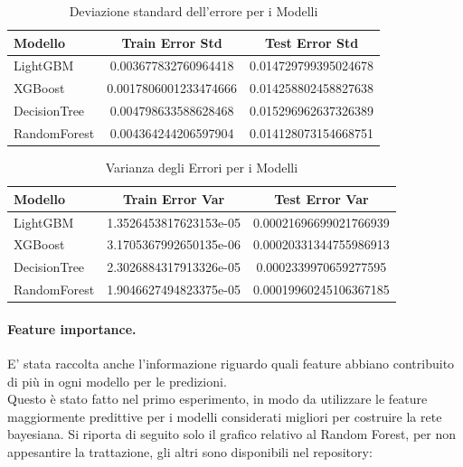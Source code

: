 \begin{table}[H]
    \centering
    \begin{tabular}{lcc}
    \toprule
    \textbf{Modello} & \textbf{Train Error Std} & \textbf{Test Error Std} \\
    \midrule
    LightGBM & 0.003677832760964418 & 0.014729799395024678 \\
    XGBoost & 0.0017806001233474666 & 0.014258802458827638 \\
    DecisionTree & 0.004798633588628468 & 0.015296962637326389 \\
    RandomForest & 0.004364244206597904 & 0.014128073154668751 \\
    \bottomrule
    \end{tabular}
    \caption{Deviazione standard dell'errore per i Modelli}
    
\end{table}

\begin{table}[H]
    \centering
    \begin{tabular}{lcc}
    \toprule
    \textbf{Modello} & \textbf{Train Error Var} & \textbf{Test Error Var} \\
    \midrule
    LightGBM & 1.3526453817623153e-05 & 0.00021696699021766939 \\
    XGBoost & 3.1705367992650135e-06 & 0.00020331344755986913 \\
    DecisionTree & 2.3026884317913326e-05 & 0.0002339970659277595 \\
    RandomForest & 1.9046627494823375e-05 & 0.00019960245106367185 \\
    \bottomrule
    \end{tabular}
    \caption{Varianza degli Errori per i Modelli}
    
\end{table}

\paragraph{Feature importance.} E' stata raccolta anche l'informazione riguardo quali feature abbiano contribuito di più in ogni modello per le predizioni.
\\Questo è stato fatto nel primo esperimento, in modo da utilizzare le feature maggiormente predittive per i modelli considerati migliori per costruire la rete bayesiana. Si riporta di seguito solo il grafico relativo al Random Forest, per non appesantire la trattazione, gli altri sono disponibili nel repository:

